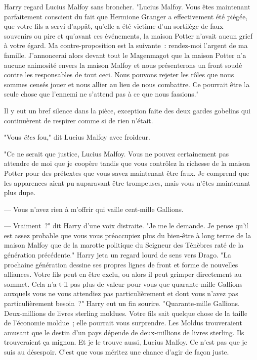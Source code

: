 Harry regard Lucius Malfoy sans broncher. "Lucius Malfoy. Vous êtes maintenant parfaitement conscient du fait que Hermione Granger a effectivement été piégée, que votre fils a servi d'appât, qu'elle a été victime d'un sortilège de faux souvenirs ou pire et qu'avant ces événements, la maison Potter n'avait aucun grief à votre égard. Ma contre-proposition est la suivante~: rendez-moi l'argent de ma famille. J'annoncerai alors devant tout le Magenmagot que la maison Potter n'a aucune animosité envers la maison Malfoy et nous présenterons un front soudé contre les responsables de tout ceci. Nous pouvons rejeter les rôles que nous sommes censés jouer et nous allier au lieu de nous combattre. Ce pourrait être la seule chose que l'ennemi ne s'attend pas à ce que nous fassions."

Il y eut un bref silence dans la pièce, exception faite des deux gardes gobelins qui continuèrent de respirer comme si de rien n'était.

"Vous \emph{êtes} fou," dit Lucius Malfoy avec froideur.

"Ce ne serait que justice, Lucius Malfoy. Vous ne pouvez certainement pas attendre de moi que je coopère tandis que vous contrôlez la richesse de la maison Potter pour des prétextes que vous savez maintenant être faux. Je comprend que les apparences aient pu auparavant être trompeuses, mais vous n'êtes maintenant plus dupe.

--- Vous n'avez rien à m'offrir qui vaille cent-mille Gallions.

--- Vraiment~?" dit Harry d'une voix distraite. "Je me le demande. Je pense qu'il est assez probable que vous vous préoccupiez plus du bien-être à long terme de la maison Malfoy que de la marotte politique du Seigneur des Ténèbres raté de la génération précédente." Harry jeta un regard lourd de sens vers Drago. "La prochaine génération dessine ses propres lignes de front et forme de nouvelles alliances. Votre fils peut en être exclu, ou alors il peut grimper directement au sommet. Cela n'a-t-il pas plus de valeur pour vous que quarante-mille Gallions auxquels vous ne vous attendiez pas particulièrement et dont vous n'avez pas particulièrement besoin~?" Harry eut un fin sourire. "Quarante-mille Gallions. Deux-millions de livres sterling moldues. Votre fils sait quelque chose de la taille de l'économie moldue~; elle pourrait vous surprendre. Les Moldus trouveraient amusant que le destin d'un pays dépende de deux-millions de livres sterling. Ils trouveraient ça mignon. Et je le trouve aussi, Lucius Malfoy. Ce n'est pas que je suis au désespoir. C'est que vous méritez une chance d'agir de façon juste.

